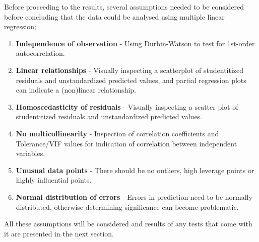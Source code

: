 \documentclass{sigchi}
\begin{document}
Before proceeding to the results, several assumptions needed to be considered before concluding that the data could be analysed using multiple linear regression;
\begin{enumerate}
  \item \textbf{Independence of observation} - Using Durbin-Watson to test for 1st-order autocorrelation.
  \item \textbf{Linear relationships} - Visually inspecting a scatterplot of studentitized residuals and unstandardized predicted values, and partial regression plots can indicate a (non)linear relationship.
  \item \textbf{Homoscedasticity of residuals} - Visually inspecting a scatter plot of studentitized residuals and unstandardized predicted values.
  \item \textbf{No multicollinearity} - Inspection of correlation coefficients and Tolerance/VIF values for indication of correlation between independent variables.
  \item \textbf{Unusual data points} - There should be no outliers, high leverage points or highly influential points.
  \item \textbf{Normal distribution of errors} - Errors in prediction need to be normally distributed, otherwise determining significance can become problematic.
\end{enumerate}
All these assumptions will be considered and results of any tests that come with it are presented in the next section.


\end{document}
